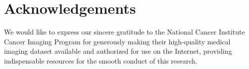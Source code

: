 \documentclass[a4paper, times, 10pt,twocolumn]{article}
\begin{document}
\section*{Acknowledgements}
We would like to express our sincere gratitude to the National Cancer Institute Cancer Imaging Program for generously making their high-quality medical imaging dataset available and authorized for use on the Internet, providing indispensable resources for the smooth conduct of this research.



%
%




%
%


\end{document}
